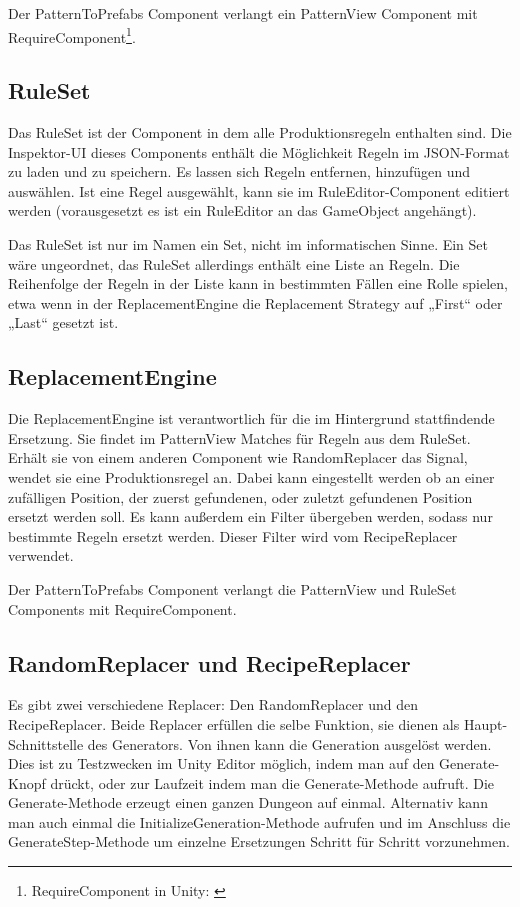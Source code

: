 Der PatternToPrefabs Component verlangt ein PatternView Component mit RequireComponent\footnote{RequireComponent in Unity: \cite[Seite: RequireComponent]{unitySciptingReference}}.

\subsection{RuleSet}

Das RuleSet ist der Component in dem alle Produktionsregeln enthalten sind. Die Inspektor-UI dieses Components enthält die Möglichkeit Regeln im JSON-Format zu laden und zu speichern. Es lassen sich Regeln entfernen, hinzufügen und auswählen. Ist eine Regel ausgewählt, kann sie im RuleEditor-Component editiert werden (vorausgesetzt es ist ein RuleEditor an das GameObject angehängt).

Das RuleSet ist nur im Namen ein Set, nicht im informatischen Sinne. Ein Set wäre ungeordnet, das RuleSet allerdings enthält eine Liste an Regeln. Die Reihenfolge der Regeln in der Liste kann in bestimmten Fällen eine Rolle spielen, etwa wenn in der ReplacementEngine die Replacement Strategy auf „First“ oder „Last“ gesetzt ist.

\subsection{ReplacementEngine}

Die ReplacementEngine ist verantwortlich für die im Hintergrund stattfindende Ersetzung. Sie findet im PatternView Matches für Regeln aus dem RuleSet. Erhält sie von einem anderen Component wie RandomReplacer das Signal, wendet sie eine Produktionsregel an. Dabei kann eingestellt werden ob an einer zufälligen Position, der zuerst gefundenen, oder zuletzt gefundenen Position ersetzt werden soll. Es kann außerdem ein Filter übergeben werden, sodass nur bestimmte Regeln ersetzt werden. Dieser Filter wird vom RecipeReplacer verwendet.

Der PatternToPrefabs Component verlangt die PatternView und RuleSet Components mit RequireComponent.

\subsection{RandomReplacer und RecipeReplacer}\label{ss.replacers}

Es gibt zwei verschiedene Replacer: Den RandomReplacer und den RecipeReplacer. Beide Replacer erfüllen die selbe Funktion, sie dienen als Haupt-Schnittstelle des Generators. Von ihnen kann die Generation ausgelöst werden. Dies ist zu Testzwecken im Unity Editor möglich, indem man auf den Generate-Knopf drückt, oder zur Laufzeit indem man die Generate-Methode aufruft. Die Generate-Methode erzeugt einen ganzen Dungeon auf einmal. Alternativ kann man auch einmal die InitializeGeneration-Methode aufrufen und im Anschluss die GenerateStep-Methode um einzelne Ersetzungen Schritt für Schritt vorzunehmen.

